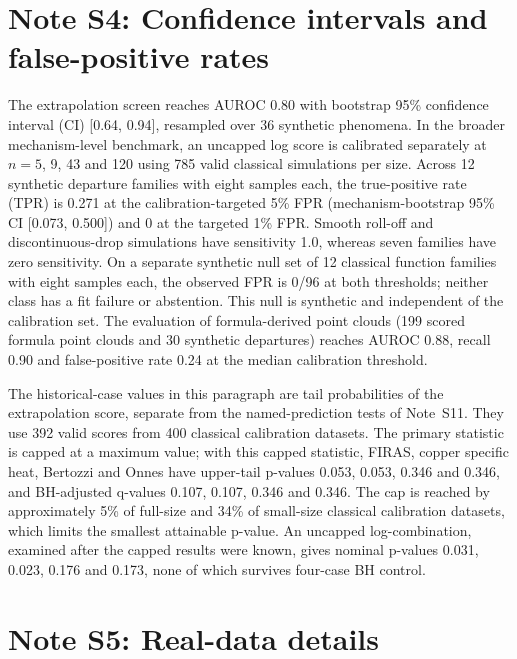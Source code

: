 \documentclass{article}
\begin{document}
\section{Note S4: Confidence intervals and false-positive rates}

The extrapolation screen reaches AUROC 0.80 with bootstrap 95\% confidence interval (CI) [0.64, 0.94], resampled over 36 synthetic phenomena. In the broader mechanism-level benchmark, an uncapped log score is calibrated separately at $n = 5$, 9, 43 and 120 using 785 valid classical simulations per size. Across 12 synthetic departure families with eight samples each, the true-positive rate (TPR) is 0.271 at the calibration-targeted 5\% FPR (mechanism-bootstrap 95\% CI [0.073, 0.500]) and 0 at the targeted 1\% FPR. Smooth roll-off and discontinuous-drop simulations have sensitivity 1.0, whereas seven families have zero sensitivity. On a separate synthetic null set of 12 classical function families with eight samples each, the observed FPR is 0/96 at both thresholds; neither class has a fit failure or abstention. This null is synthetic and independent of the calibration set. The evaluation of formula-derived point clouds (199 scored formula point clouds and 30 synthetic departures) reaches AUROC 0.88, recall 0.90 and false-positive rate 0.24 at the median calibration threshold.

The historical-case values in this paragraph are tail probabilities of the extrapolation score, separate from the named-prediction tests of Note~S11. They use 392 valid scores from 400 classical calibration datasets. The primary statistic is capped at a maximum value; with this capped statistic, FIRAS, copper specific heat, Bertozzi and Onnes have upper-tail p-values 0.053, 0.053, 0.346 and 0.346, and BH-adjusted q-values 0.107, 0.107, 0.346 and 0.346. The cap is reached by approximately 5\% of full-size and 34\% of small-size classical calibration datasets, which limits the smallest attainable p-value. An uncapped log-combination, examined after the capped results were known, gives nominal p-values 0.031, 0.023, 0.176 and 0.173, none of which survives four-case BH control.

\section{Note S5: Real-data details}
\end{document}
